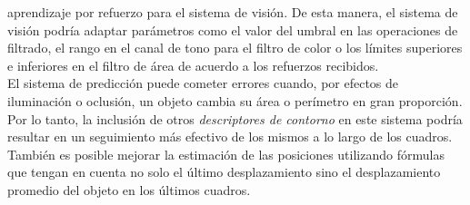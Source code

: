 aprendizaje por refuerzo para el sistema de visi\'on. De esta manera, el 
sistema de visi\'on podr\'ia adaptar par\'ametros como el valor del umbral en las
operaciones de filtrado, el rango en el canal de tono para el filtro de color o los l\'imites 
superiores e inferiores en el filtro de \'area de acuerdo a los 
refuerzos recibidos.\\
\indent El sistema de predicci\'on puede cometer errores cuando, por 
efectos de iluminaci\'on o oclusi\'on, un objeto cambia su \'area o 
per\'imetro en gran proporci\'on. Por lo tanto, la inclusi\'on de otros 
\emph{descriptores de contorno} en este sistema podr\'ia resultar en un 
seguimiento m\'as efectivo de los mismos a lo largo de los cuadros. 
Tambi\'en es posible mejorar la estimaci\'on de las posiciones utilizando 
f\'ormulas que tengan en cuenta no solo el \'ultimo desplazamiento sino 
el desplazamiento promedio del objeto en los \'ultimos cuadros.


